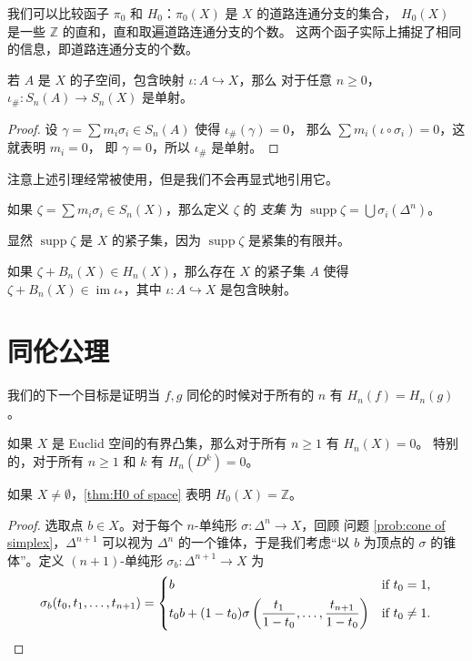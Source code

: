 \documentclass[fontset=none]{Notes}
\DeclareMathOperator\im{im}
\DeclareMathOperator\supp{supp}
\begin{document}
我们可以比较函子 $\pi_0$ 和 $H_0$：$\pi_0(X)$ 是 $X$ 的道路连通分支的集合，
$H_0(X)$ 是一些 $\mathbb{Z}$ 的直和，直和取遍道路连通分支的个数。
这两个函子实际上捕捉了相同的信息，即道路连通分支的个数。

\begin{lemma}
  若 $A$ 是 $X$ 的子空间，包含映射 $\iota:A\hookrightarrow X$，那么
  对于任意 $n\geq 0$，$\iota_\#:S_n(A)\to S_n(X)$ 是单射。
\end{lemma}
\begin{proof}
  设 $\gamma=\sum m_i\sigma_i\in S_n(A)$ 使得 $\iota_\#(\gamma)=0$，
  那么 $\sum m_i(\iota\circ\sigma_i)=0$，这就表明 $m_i=0$，
  即 $\gamma=0$，所以 $\iota_\#$ 是单射。
\end{proof}

注意上述引理经常被使用，但是我们不会再显式地引用它。

\begin{definition}
  如果 $\zeta=\sum m_i\sigma_i\in S_n(X)$，那么定义 $\zeta$ 的
  \emph{支集} 为 $\supp\zeta=\bigcup \sigma_i(\Delta^n)$。
\end{definition}

显然 $\supp\zeta$ 是 $X$ 的紧子集，因为 $\supp\zeta$ 是紧集的有限并。

\begin{theorem}
  如果 $\zeta+B_n(X)\in H_n(X)$，那么存在 $X$ 的紧子集 $A$ 使得
  $\zeta+B_n(X)\in\im\iota_*$，其中 $\iota:A\hookrightarrow X$ 是包含映射。
\end{theorem}

\section{同伦公理}

我们的下一个目标是证明当 $f,g$ 同伦的时候对于所有的 $n$
有 $H_n(f)=H_n(g)$。

\begin{theorem}
  如果 $X$ 是 Euclid 空间的有界凸集，那么对于所有 $n\geq 1$ 有 $H_n(X)=0$。
  特别的，对于所有 $n\geq 1$ 和 $k$ 有 $H_n(D^k)=0$。
\end{theorem}
\begin{remark}
  如果 $X\neq\emptyset$，\autoref{thm:H0 of space} 表明 $H_0(X)=\mathbb{Z}$。
\end{remark}
\begin{proof}
  选取点 $b\in X$。对于每个 $n$-单纯形 $\sigma:\Delta^n\to X$，回顾
  问题 \ref{prob:cone of simplex}，$\Delta^{n+1}$ 可以视为 $\Delta^n$
  的一个锥体，于是我们考虑“以 $b$ 为顶点的 $\sigma$ 的锥体”。定义
  $(n+1)$-单纯形 $\sigma_b:\Delta^{n+1}\to X$ 为
  \[
    \sigma_b(t_0,t_1,\dots,t_{n+1})=\begin{dcases}
      b & \text{if $t_0=1$},\\
      t_0b+(1-t_0)\sigma\left(
        \frac{t_1}{1-t_0},\dots,\frac{t_{n+1}}{1-t_0}
      \right) & \text{if $t_0\neq 1$}.
    \end{dcases}
  \]
\end{proof}
\end{document}
